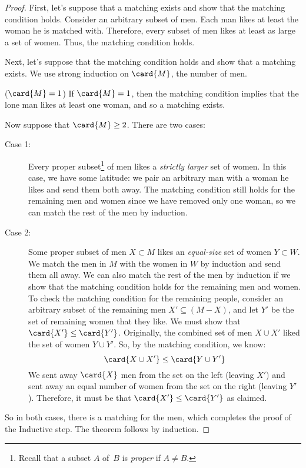 \begin{proof}
First, let's suppose that a matching exists and show that the matching
condition holds.  Consider an arbitrary subset of men.  Each man likes
at least the woman he is matched with.  Therefore, every subset of men
likes at least as large a set of women.  Thus, the matching condition
holds.

Next, let's suppose that the matching condition holds and show that a
matching exists.  We use strong induction on $\card{M}$, the number of
men.

 ($\card{M}=1$) If $\card{M} = 1$, then the
matching condition implies that the lone man likes at least one woman,
and so a matching exists.

 Now suppose that $\card{M} \geq 2$.
There are two cases:
\begin{description}

\item[Case 1:] Every proper subset\footnote{Recall that a subset $A$
  of~$B$ is \emph{proper} if $A \ne B$.} of men likes a \emph{strictly
  larger} set of women.  In this case, we have some latitude: we pair
  an arbitrary man with a woman he likes and send them both away.  The
  matching condition still holds for the remaining men and women since
  we have removed only one woman, so we can match the rest of the
  men by induction.

\item[Case 2:] Some proper subset of men $X \subset M$ likes an
  \emph{equal-size} set of women $Y \subset W$.  We match the men in
  $M$ with the women in $W$ by induction and send them all away.  We
  can also match the rest of the men by induction if we show that the
  matching condition holds for the remaining men and women.  To check
  the matching condition for the remaining people, consider an
  arbitrary subset of the remaining men $X' \subseteq (M - X)$, and
  let $Y'$ be the set of remaining women that they like.  We must show
  that $\card{X'} \leq \card{Y'}$.  Originally, the combined set of
  men $X \cup X'$ liked the set of women $Y \cup Y'$.  So, by the
  matching condition, we know:
%
  \begin{equation*}
  \card{X \cup X'}  \leq  \card{Y \cup Y'}
  \end{equation*}
%
  We sent away $\card{X}$ men from the set on the left (leaving $X'$)
  and sent away an equal number of women from the set on the right
  (leaving $Y'$).  Therefore, it must be that $\card{X'} \leq
  \card{Y'}$ as claimed.
\end{description}

So in both cases, there is a matching for the men, which completes the
proof of the Inductive step.  The theorem follows by induction.
\end{proof}

